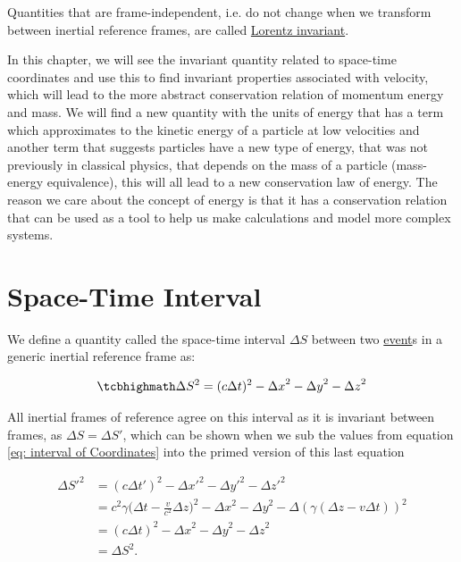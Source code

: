 Quantities that are frame-independent, i.e.
do not change when we transform between inertial reference frames, are called \hyperlink{def-lorentz-invariant}{Lorentz invariant}.

In this chapter, we will see the invariant quantity related to space-time coordinates and use this to find invariant properties associated with velocity, which will lead to the more abstract conservation relation of momentum energy and mass.
We will find a new quantity with the units of energy that has a term which approximates to the kinetic energy of a particle at low velocities and another term that suggests particles have a new type of energy, that was not previously in classical physics, that depends on the mass of a particle (mass-energy equivalence), this will all lead to a new conservation law of energy.
The reason we care about the concept of energy is that it has a conservation relation that can be used as a tool to help us make calculations and model more complex systems.

\section{Space-Time Interval} \label{sect: Space-Time Interval}

We define a quantity called the space-time interval $\Delta S$ between two \hyperlink{def-event}{event}s in a generic inertial reference frame as:

\begin{equation}
	\mhl{
	\Delta S^2 = (c\Delta t)^2-{\Delta x}^2-{\Delta y}^2-{\Delta z}^2
	}
	\label{eq: space-time interval}
\end{equation}

All inertial frames of reference agree on this interval as it is invariant between frames, as $\Delta S = \Delta S{'}$, which can be shown when we sub the values from equation \eqref{eq: interval of Coordinates} into the primed version of this last equation

\begin{equation}
	\begin{aligned}
		\Delta S{'}^2 & = (c{\Delta t{'}})^2-\Delta x{'}^2-{\Delta y{'}}^2-{\Delta z{'}}^2                                                                             \\
		              & = {c}^2{\gamma} \bigg( \Delta t-\frac{v}{{c}^2} {\Delta z} \bigg)^2-{\Delta x}^2-{\Delta y}^2-\Delta ({\gamma} ( {\Delta z}- {v} \Delta t) )^2 \\
		              & = (c\Delta t)^2-{\Delta x}^2-{\Delta y}^2-{\Delta z}^2                                                                                         \\
		              & = \Delta S^2.
	\end{aligned}
\end{equation}

